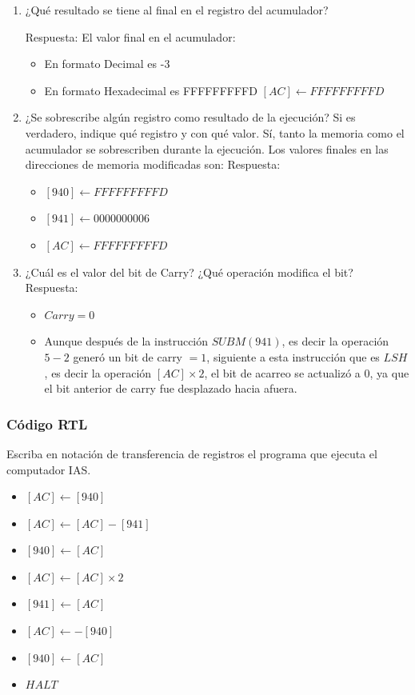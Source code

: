 \documentclass{article}
\begin{document}
\begin{enumerate}
\item ¿Qué resultado se tiene al final en el registro del acumulador?

Respuesta:
El valor final en el acumulador:
\begin{itemize}
\item En formato Decimal es -3
\item En formato Hexadecimal es FFFFFFFFFD
\([AC] \leftarrow FFFFFFFFFD\)
\end{itemize}

\item ¿Se sobrescribe algún registro como resultado de la ejecución? Si
es verdadero, indique qué registro y con qué valor.
Sí, tanto la memoria como el acumulador se sobrescriben durante la
ejecución.
Los valores finales en las direcciones de memoria modificadas son:
Respuesta:
\begin{itemize}
\item \([940] \leftarrow FFFFFFFFFD\)
\item \([941] \leftarrow 0000000006\)
\item \([AC] \leftarrow FFFFFFFFFD\)
\end{itemize}

\item ¿Cuál es el valor del bit de Carry? ¿Qué operación modifica el bit?
Respuesta:
\begin{itemize}
\item \(Carry = 0\)

\item Aunque después de la instrucción \(SUB M(941)\), es decir la
operación \(5-2\) generó un bit de carry \(= 1\), siguiente a esta
instrucción que es \(LSH\), es decir la operación \([AC]\times2\), el
bit de acarreo se actualizó a 0, ya que el bit anterior de carry
fue desplazado hacia afuera.
\end{itemize}
\end{enumerate}

\subsubsection{Código RTL}
\label{sec:org6361505}

Escriba en notación de transferencia de registros el programa que
ejecuta el computador IAS.
\begin{itemize}
\item \([AC]\leftarrow[940]\)
\item \([AC]\leftarrow[AC]-[941]\)
\item \([940]\leftarrow[AC]\)
\item \([AC]\leftarrow[AC]\times2\)
\item \([941]\leftarrow[AC]\)
\item \([AC]\leftarrow-[940]\)
\item \([940]\leftarrow[AC]\)
\item \(HALT\)
\end{itemize}
\end{document}
